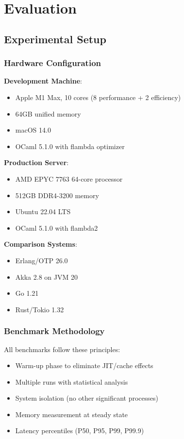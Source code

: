 \documentclass[12pt,a4paper]{report}
\begin{document}
\chapter{Evaluation}

\section{Experimental Setup}

\subsection{Hardware Configuration}

\textbf{Development Machine}:
\begin{itemize}
\item Apple M1 Max, 10 cores (8 performance + 2 efficiency)
\item 64GB unified memory
\item macOS 14.0
\item OCaml 5.1.0 with flambda optimizer
\end{itemize}

\textbf{Production Server}:
\begin{itemize}
\item AMD EPYC 7763 64-core processor
\item 512GB DDR4-3200 memory
\item Ubuntu 22.04 LTS
\item OCaml 5.1.0 with flambda2
\end{itemize}

\textbf{Comparison Systems}:
\begin{itemize}
\item Erlang/OTP 26.0
\item Akka 2.8 on JVM 20
\item Go 1.21
\item Rust/Tokio 1.32
\end{itemize}

\subsection{Benchmark Methodology}

All benchmarks follow these principles:
\begin{itemize}
\item Warm-up phase to eliminate JIT/cache effects
\item Multiple runs with statistical analysis
\item System isolation (no other significant processes)
\item Memory measurement at steady state
\item Latency percentiles (P50, P95, P99, P99.9)
\end{itemize}
\end{document}
